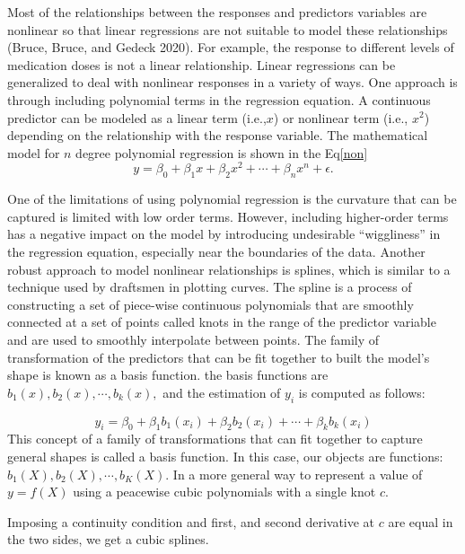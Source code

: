 \documentclass[
  12pt,
]{article}
\begin{document}
Most of the relationships between the responses and predictors variables are nonlinear so that linear regressions are not suitable to model these relationships (Bruce, Bruce, and Gedeck 2020). For example, the response to different levels of medication doses is not a linear relationship. Linear regressions can be generalized to deal with nonlinear responses in a variety of ways. One approach is through including polynomial terms in the regression equation. A continuous predictor can be modeled as a linear term (i.e.,\(x\)) or nonlinear term (i.e., \(x^2\)) depending on the relationship with the response variable.
The mathematical model for \(n\) degree polynomial regression is shown in the Eq\eqref{non}
\begin{equation}\label{non}
 y=\beta_0+\beta_1 x+\beta_2 x^2+\cdots+\beta_n x^n+\epsilon.
 \end{equation}

One of the limitations of using polynomial regression is the curvature that can be captured is limited with low order terms. However, including higher-order terms has a negative impact on the model by introducing undesirable ``wiggliness'' in the regression equation, especially near the boundaries of the data. Another robust approach to model nonlinear relationships is splines, which is similar to a technique used by draftsmen in plotting curves.
The spline is a process of constructing a set of piece-wise continuous polynomials that are smoothly connected at a set of points called knots in the range of the predictor variable and are used to smoothly interpolate between points. The family of transformation of the predictors that can be fit together to built the model's shape is known as a basis function.
the basis functions are \(b_1(x),b_2(x), \cdots,b_k(x),\) and the estimation of \(y_i\) is computed as follows:

\begin{equation}
y_i=\beta_0+\beta_1 b_1(x_i)+\beta_2 b_2(x_i)+\cdots+ \beta_k b_k(x_i)
\end{equation}
This concept of a family of transformations that can fit together to capture general shapes is called a basis function. In this case, our objects are functions: \(b_1 (X ), b_2 (X ),\cdots , b_K (X ).\) In a more general way to represent a value of \(y=f(X)\) using a peacewise cubic polynomials with a single knot \(c.\)

Imposing a continuity condition and first, and second derivative at \(c\) are equal in the two sides, we get a cubic splines.
\end{document}
